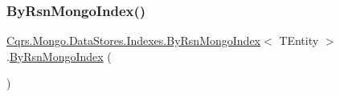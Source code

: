 \subsubsection{\texorpdfstring{By\+Rsn\+Mongo\+Index()}{ByRsnMongoIndex()}}
{\footnotesize\ttfamily \hyperlink{classCqrs_1_1Mongo_1_1DataStores_1_1Indexes_1_1ByRsnMongoIndex}{Cqrs.\+Mongo.\+Data\+Stores.\+Indexes.\+By\+Rsn\+Mongo\+Index}$<$ T\+Entity $>$.\hyperlink{classCqrs_1_1Mongo_1_1DataStores_1_1Indexes_1_1ByRsnMongoIndex}{By\+Rsn\+Mongo\+Index} (\begin{DoxyParamCaption}{ }\end{DoxyParamCaption})\hspace{0.3cm}{\ttfamily [protected]}}

